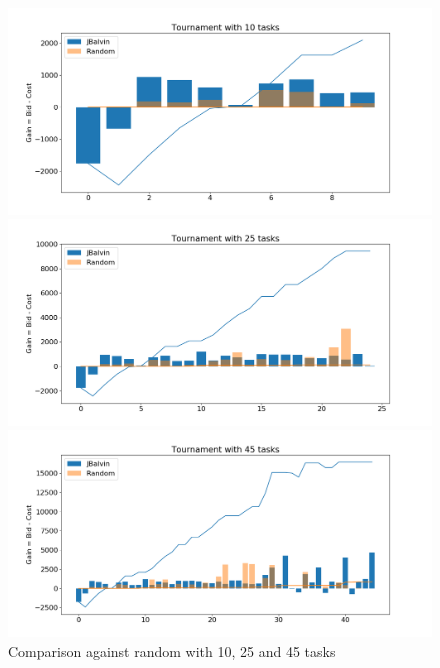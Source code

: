 \documentclass[11pt]{article}
\begin{document}
\begin{figure}[ht]
    \centering
\begin{minipage}[]{0.3\textwidth}
\includegraphics[width=\textwidth]{plots/random_10.png}
\end{minipage}
\begin{minipage}[]{0.3\textwidth}
\includegraphics[width=\textwidth]{plots/random_25.png}
\end{minipage}
\begin{minipage}[]{0.3\textwidth}
\includegraphics[width=\textwidth]{plots/random_45.png}
\end{minipage}
\caption{Comparison against random with 10, 25 and 45 tasks}
\label{fig:random}
\end{figure}
\end{document}
